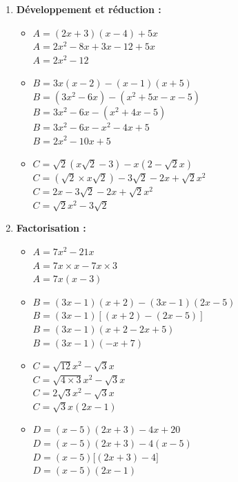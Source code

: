 \documentclass[10pt, a4paper]{article}
\begin{document}
\begin{Solution}[APPLICATION][2]
\begin{enumerate}
    \item \textbf{Développement et réduction :}
    \begin{itemize}
        \item $A = (2x + 3)(x - 4) + 5x$ \\
        $ A = 2x^2 - 8x + 3x - 12 + 5x$ \\
        $ A = 2x^2 - 12$
        
        \item $B = 3x(x - 2) - (x - 1)(x + 5)$ \\
        $B = (3x^2 - 6x) - (x^2 + 5x - x - 5)$ \\
        $B = 3x^2 - 6x - (x^2 + 4x - 5)$ \\
        $B = 3x^2 - 6x - x^2 - 4x + 5$ \\
        $B = 2x^2 - 10x + 5$
        
        \item $C = \sqrt{2}(x\sqrt{2} - 3) - x(2 - \sqrt{2}x)$ \\
        $C = (\sqrt{2} \times x\sqrt{2}) - 3\sqrt{2} - 2x + \sqrt{2}x^2$ \\
        $C = 2x - 3\sqrt{2} - 2x + \sqrt{2}x^2$ \\
        $C = \sqrt{2}x^2 - 3\sqrt{2}$
    \end{itemize}

    \item \textbf{Factorisation :}
    \begin{itemize}
        \item $A = 7x^2 - 21x$ \\
        $A = 7x \times x - 7x \times 3$ \\
        $A = 7x(x - 3)$
        
        \item $B = (3x - 1)(x + 2) - (3x - 1)(2x - 5)$ \\
        $B = (3x - 1) \left[ (x + 2) - (2x - 5) \right]$ \\
        $B = (3x - 1)(x + 2 - 2x + 5)$ \\
        $B = (3x - 1)(-x + 7)$
        
        \item $C = \sqrt{12}x^2 - \sqrt{3}x$ \\
        $C = \sqrt{4 \times 3}x^2 - \sqrt{3}x$ \\
        $C = 2\sqrt{3}x^2 - \sqrt{3}x$ \\
        $C = \sqrt{3}x(2x - 1)$

        \item $D = (x - 5)(2x + 3) - 4x + 20$ \\
$D = (x - 5)(2x + 3) - 4(x - 5)$ \\
$D = (x - 5)\big[(2x + 3) - 4\big]$ \\
$D = (x - 5)(2x - 1)$
    \end{itemize}
\end{enumerate}
\end{Solution}
\end{document}

